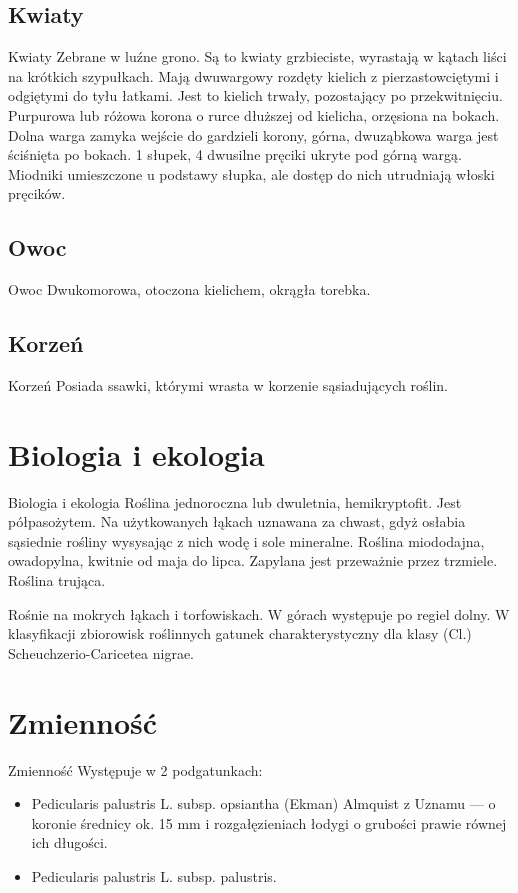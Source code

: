 \documentclass{beamer}
\begin{document}
\subsection{Kwiaty}
\begin{frame}{Kwiaty}
Zebrane w luźne grono. Są to kwiaty grzbieciste, wyrastają w kątach liści na krótkich szypułkach. Mają dwuwargowy rozdęty kielich z pierzastowciętymi i odgiętymi do tyłu łatkami. Jest to kielich trwały, pozostający po przekwitnięciu. Purpurowa lub różowa korona o rurce dłuższej od kielicha, orzęsiona na bokach. Dolna warga zamyka wejście do gardzieli korony, górna, dwuząbkowa warga jest ściśnięta po bokach. 1 słupek, 4 dwusilne pręciki ukryte pod górną wargą. Miodniki umieszczone u podstawy słupka, ale dostęp do nich utrudniają włoski pręcików.
\end{frame}

\subsection{Owoc}
\begin{frame}{Owoc}
Dwukomorowa, otoczona kielichem, okrągła torebka.
\end{frame}

\subsection{Korzeń}
\begin{frame}{Korzeń}
Posiada ssawki, którymi wrasta w korzenie sąsiadujących roślin.
\end{frame}

\section{Biologia i ekologia}
\begin{frame}{Biologia i ekologia}
Roślina jednoroczna lub dwuletnia, hemikryptofit. Jest półpasożytem. Na użytkowanych łąkach uznawana za chwast, gdyż osłabia sąsiednie rośliny wysysając z nich wodę i sole mineralne. Roślina miododajna, owadopylna, kwitnie od maja do lipca. Zapylana jest przeważnie przez trzmiele. Roślina trująca.

Rośnie na mokrych łąkach i torfowiskach. W górach występuje po regiel dolny. W klasyfikacji zbiorowisk roślinnych gatunek charakterystyczny dla klasy (Cl.) Scheuchzerio-Caricetea nigrae.
\end{frame}

\section{Zmienność}
\begin{frame}{Zmienność}
Występuje w 2 podgatunkach:
\begin{itemize}
\item Pedicularis palustris L. subsp. opsiantha (Ekman) Almquist z Uznamu --- o koronie średnicy ok. 15 mm i rozgałęzieniach łodygi o grubości prawie równej ich długości.

\item Pedicularis palustris L. subsp. palustris.
\end{itemize}
\end{frame}
\end{document}
